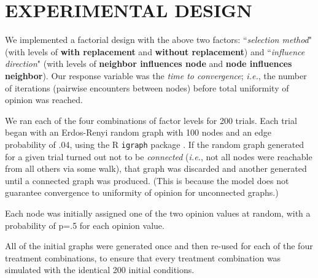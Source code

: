 
\section{EXPERIMENTAL DESIGN}

We implemented a factorial design with the above two factors:
``\textsl{selection method}" (with levels of \textbf{with replacement} and
\textbf{without replacement}) and ``\textsl{influence direction}" (with levels
of \textbf{neighbor influences node} and \textbf{node influences neighbor}).
Our response variable was the \textsl{time to convergence}; \textit{i.e.}, the
number of iterations (pairwise encounters between nodes) before total
uniformity of opinion was reached.

We ran each of the four combinations of factor levels for 200 trials. Each
trial began with an Erdos-Renyi random graph \cite{erdos_random_1959} with 100
nodes and an edge probability of .04, using the R \texttt{igraph} package
\cite{igraph}. If the random graph generated for a given trial turned out not
to be \textit{connected} (\textit{i.e.}, not all nodes were reachable from all
others via some walk), that graph was discarded and another generated until a
connected graph was produced. (This is because the model does not guarantee
convergence to uniformity of opinion for unconnected graphs.)

Each node was initially assigned one of the two opinion values at random, with
a probability of p=.5 for each opinion value. 

All of the initial graphs were generated once and then re-used for each of the
four treatment combinations, to ensure that every treatment combination was
simulated with the identical 200 initial conditions.

